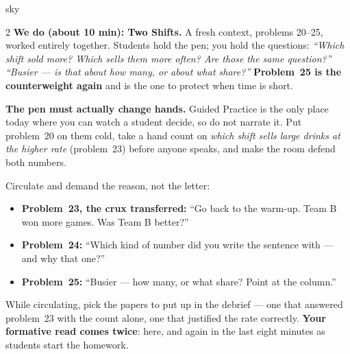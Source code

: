 \documentclass[10pt]{article}
\begin{document}
\begin{skillbox}{sky}
\begin{multicols}{2}
\columnbreak
\textbf{We do (about 10 min): Two Shifts.} A fresh context, problems 20--25, worked entirely
together. Students hold the pen; you hold the questions: \emph{``Which shift sold more? Which
sells them more often? Are those the same question?''} \quad \emph{``Busier --- is that about
how many, or about what share?''} \textbf{Problem~25 is the counterweight again} and is the one
to protect when time is short.

\textbf{The pen must actually change hands.} Guided Practice is the only place today where you
can watch a student decide, so do not narrate it. Put problem~20 on them cold, take a hand count
on \emph{which shift sells large drinks at the higher rate} (problem~23) before anyone speaks,
and make the room defend both numbers.

Circulate and demand the reason, not the letter:
\begin{itemize}[leftmargin=1.1em, nosep]
  \item \textbf{Problem~23, the crux transferred:} ``Go back to the warm-up. Team B won more
        games. Was Team B better?''
  \item \textbf{Problem~24:} ``Which kind of number did you write the sentence with --- and why
        that one?''
  \item \textbf{Problem~25:} ``Busier --- how many, or what share? Point at the column.''
\end{itemize}
While circulating, pick the papers to put up in the debrief --- one that answered problem~23 with
the count alone, one that justified the rate correctly. \textbf{Your formative read comes twice}:
here, and again in the last eight minutes as students start the homework.
\end{multicols}
\end{skillbox}
\end{document}
